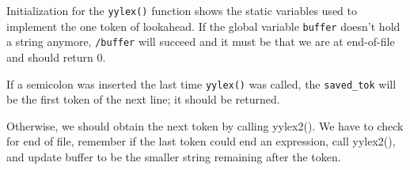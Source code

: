Initialization for the \texttt{yylex()} function shows the static
variables used to implement the one token of lookahead. If the global
variable \texttt{buffer} doesn't hold a string anymore,
\texttt{/buffer} will succeed and it must be that we are at
end-of-file and should return 0.



If a semicolon was inserted the last time \texttt{yylex()} was called,
the \texttt{saved\_tok} will be the first token of the next line; it
should be returned.


Otherwise, we should obtain the next token by calling yylex2(). We
have to check for end of file, remember if the last token could end an
expression, call yylex2(), and update buffer to be the smaller string
remaining after the token.

